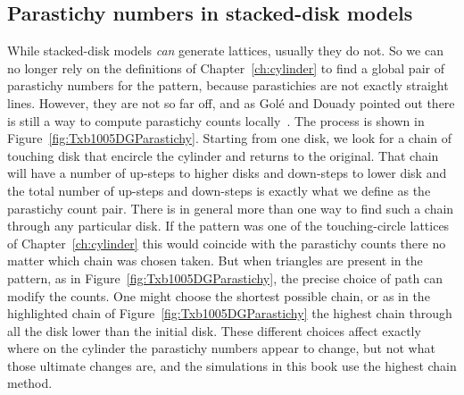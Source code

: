 \subsection{Parastichy numbers in stacked-disk models}
While stacked-disk models \textit{can} generate lattices, usually they do not. 
So we can no longer rely on the  definitions of Chapter~\ref{ch:cylinder}
to find a global pair of parastichy numbers for the pattern, because  parastichies are not exactly straight lines.  However, they are not so far off, and as Gol\'e and Douady pointed out there is still a way to compute parastichy counts locally~\autocite{goleFibonacciQuasisymmetricPhyllotaxis2016}.
The process is shown in Figure~\ref{fig:Txb1005DGParastichy}. Starting from one disk, we look for a chain of touching disk that encircle the cylinder and returns to the original. That chain will have a number of up-steps to higher disks and down-steps to lower disk and the total number of up-steps and down-steps is exactly what we define as the parastichy count pair. 
%
There is in general more than one way to find such a chain through any particular disk. If the pattern was one of the touching-circle lattices of Chapter~\ref{ch:cylinder} this would coincide with the parastichy counts there no matter which chain was chosen taken. But when triangles are present in the pattern, as in Figure~\ref{fig:Txb1005DGParastichy}, the precise choice of path can modify the counts. One might choose the shortest possible chain, or as in the highlighted chain of Figure~\ref{fig:Txb1005DGParastichy} the highest chain through all the disk lower than the initial disk. These different choices affect exactly where on the cylinder the parastichy numbers appear to change, but not what those ultimate changes are, and the simulations in this book use the highest chain method. 

